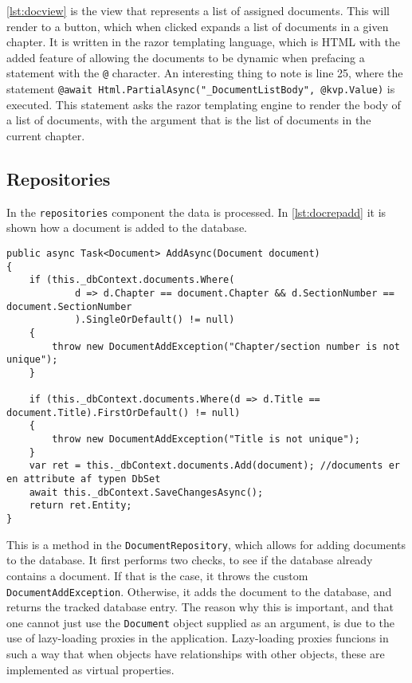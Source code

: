\cref{lst:docview} is the view that represents a list of assigned documents.
This will render to a button, which when clicked expands a list of documents in a given chapter.
It is written in the razor templating language, which is HTML with the added feature of allowing the documents to be dynamic when prefacing a statement with the \texttt{@} character.
An interesting thing to note is line 25, where the statement \texttt{@await Html.PartialAsync("_DocumentListBody", @kvp.Value)} is executed.
This statement asks the razor templating engine to render the body of a list of documents, with the argument that is the list of documents in the current chapter.

\subsection{Repositories}

In the \texttt{repositories} component the data is processed.
In \cref{lst:docrepadd} it is shown how a document is added to the database.

\begin{lstlisting}[caption={Document repository: AddAsync}, label={lst:docrepadd}]
public async Task<Document> AddAsync(Document document)
{
	if (this._dbContext.documents.Where(
			d => d.Chapter == document.Chapter && d.SectionNumber == document.SectionNumber
			).SingleOrDefault() != null)
	{
		throw new DocumentAddException("Chapter/section number is not unique");
	}

	if (this._dbContext.documents.Where(d => d.Title == document.Title).FirstOrDefault() != null)
	{
		throw new DocumentAddException("Title is not unique");
	}
	var ret = this._dbContext.documents.Add(document); //documents er en attribute af typen DbSet
	await this._dbContext.SaveChangesAsync();
	return ret.Entity;
}
\end{lstlisting}


This is a method in the \texttt{DocumentRepository}, which allows for adding documents to the database.
It first performs two checks, to see if the database already contains a document.
If that is the case, it throws the custom \texttt{DocumentAddException}.
Otherwise, it adds the document to the database, and returns the tracked database entry.
The reason why this is important, and that one cannot just use the \texttt{Document} object supplied as an argument, is due to the use of lazy-loading proxies in the application.
Lazy-loading proxies funcions in such a way that when objects have relationships with other objects, these are implemented as virtual properties.

